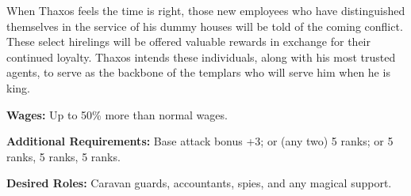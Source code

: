 When Thaxos feels the time is right, those new employees who have distinguished themselves in the service of his dummy houses will be told of the coming conflict. These select hirelings will be offered valuable rewards in exchange for their continued loyalty. Thaxos intends these individuals, along with his most trusted agents, to serve as the backbone of the templars who will serve him when he is king.

\textbf{Wages:} Up to 50\% more than normal wages.

\textbf{Additional Requirements:} Base attack bonus +3; or  (any two) 5 ranks; or  5 ranks,  5 ranks,  5 ranks.

\textbf{Desired Roles:} Caravan guards, accountants, spies, and any magical support.